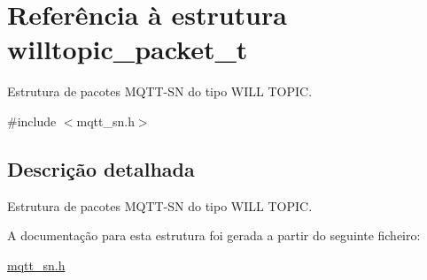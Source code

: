 \hypertarget{structwilltopic__packet__t}{\section{Referência à estrutura willtopic\+\_\+packet\+\_\+t}
\label{structwilltopic__packet__t}
}


Estrutura de pacotes M\+Q\+T\+T-\/\+S\+N do tipo W\+I\+L\+L T\+O\+P\+I\+C.  




{\ttfamily \#include $<$mqtt\+\_\+sn.\+h$>$}



\subsection{Descrição detalhada}
Estrutura de pacotes M\+Q\+T\+T-\/\+S\+N do tipo W\+I\+L\+L T\+O\+P\+I\+C. 

A documentação para esta estrutura foi gerada a partir do seguinte ficheiro\+:\begin{DoxyCompactItemize}
\item 
\hyperlink{mqtt__sn_8h}{mqtt\+\_\+sn.\+h}\end{DoxyCompactItemize}
